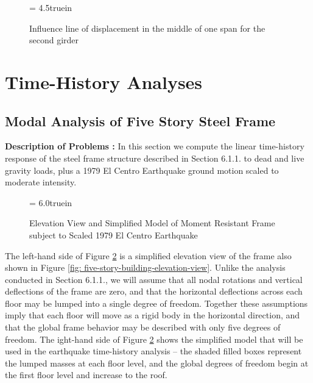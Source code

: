 \begin{figure}[h]
\epsfxsize= 4.5truein
\centerline{}
\vspace{0.20 in}
\caption{Influence line of displacement in the middle of one span
for the second girder}
\label{fig: bridge-deck-influence-part2}
\end{figure}

\clearpage
\section{Time-History Analyses}

\subsection{Modal Analysis of Five Story Steel Frame}

\vspace{0.15 in}\noindent
{\bf Description of Problems :}
In this section we compute the linear time-history response of
the steel frame structure described in Section 6.1.1. to
dead and live gravity loads, plus a 1979 El Centro Earthquake ground motion
scaled to moderate intensity.

\begin{figure}[h]
\epsfxsize= 6.0truein
\centerline{}
\caption{Elevation View and Simplified Model of Moment Resistant Frame
subject to Scaled 1979 El Centro Earthquake}
\label{fig: elevation-and-model}
\end{figure}

\vspace{0.15 in}\noindent
The left-hand side of Figure \ref{fig: elevation-and-model}
is a simplified elevation view of the frame also
shown in Figure \ref{fig: five-story-building-elevation-view}.
Unlike the analysis conducted in Section 6.1.1.,
we will assume that all nodal rotations and vertical deflections of the frame are zero,
and that the horizontal deflections across each floor may be lumped into
a single degree of freedom.
Together these assumptions imply that each floor will
move as a rigid body in the horizontal direction, and that the global
frame behavior may be described with only five degrees of freedom.
The ight-hand side of Figure \ref{fig: elevation-and-model} shows the
simplified model that will be used in the earthquake time-history
analysis -- the shaded filled boxes represent the lumped masses at
each floor level, and the global degrees of freedom begin at
the first floor level and increase to the roof.

